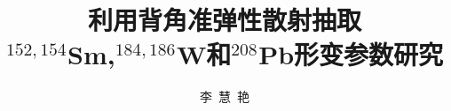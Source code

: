 \documentclass[master,chinese,pdf,AutoFakeFont=true]{ustcthesis}
\title{利用背角准弹性散射抽取\\$^{152,154}$Sm,$^{184,186}$W和$^{208}$Pb形变参数研究}
\author{李~慧~艳}
\begin{document}
\maketitle


%

\frontmatter

{
\linespread{1.25}\selectfont%
\tableofcontents
\listoffigures
\listoftables
}
% 

\newtheorem{proof_idea}{证明思路}
\newtheorem{thm}{定理}

\mainmatter
% 












\backmatter



\end{document}
